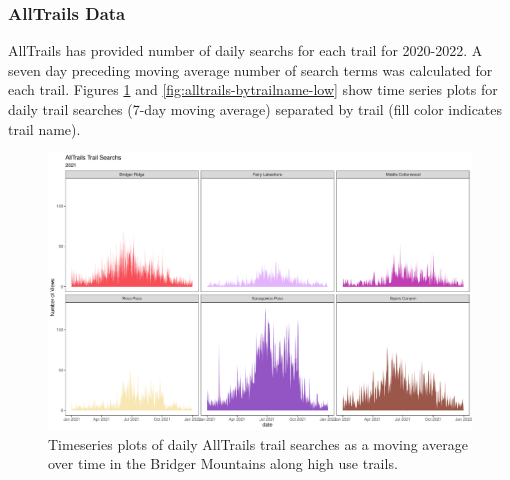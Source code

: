 \documentclass[
]{book}
\begin{document}
\hypertarget{ATData}{%
\subsubsection{AllTrails Data}\label{ATData}}

AllTrails has provided number of daily searchs for each trail for
2020-2022. A seven day preceding moving average number of search terms
was calculated for each trail. Figures
\ref{fig:alltrails-bytrailname-high} and
\ref{fig:alltrails-bytrailname-low} show time series plots for daily
trail searches (7-day moving average) separated by trail (fill color
indicates trail name).

\begin{figure}

{\centering \includegraphics[width=1\linewidth]{../figures/allTrails_search_TS_high} 

}

\caption{Timeseries plots of daily AllTrails trail searches as a moving average over time in the Bridger Mountains along high use trails.}\label{fig:alltrails-bytrailname-high}
\end{figure}
\end{document}
